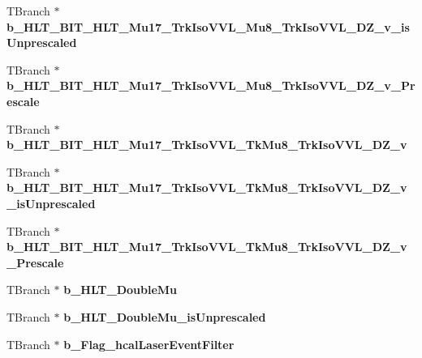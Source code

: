 \begin{DoxyCompactItemize}
\item 
\hypertarget{classMiniTree_a538e1530fa0f4f5f07d1247771ec656f}{}\label{classMiniTree_a538e1530fa0f4f5f07d1247771ec656f} 
T\+Branch $\ast$ {\bfseries b\+\_\+\+H\+L\+T\+\_\+\+B\+I\+T\+\_\+\+H\+L\+T\+\_\+\+Mu17\+\_\+\+Trk\+Iso\+V\+V\+L\+\_\+\+Mu8\+\_\+\+Trk\+Iso\+V\+V\+L\+\_\+\+D\+Z\+\_\+v\+\_\+is\+Unprescaled}
\item 
\hypertarget{classMiniTree_aa8f49c697d4c277028ecc2c251b75418}{}\label{classMiniTree_aa8f49c697d4c277028ecc2c251b75418} 
T\+Branch $\ast$ {\bfseries b\+\_\+\+H\+L\+T\+\_\+\+B\+I\+T\+\_\+\+H\+L\+T\+\_\+\+Mu17\+\_\+\+Trk\+Iso\+V\+V\+L\+\_\+\+Mu8\+\_\+\+Trk\+Iso\+V\+V\+L\+\_\+\+D\+Z\+\_\+v\+\_\+\+Prescale}
\item 
\hypertarget{classMiniTree_ae0fe7730a08495fa0900284d011ea243}{}\label{classMiniTree_ae0fe7730a08495fa0900284d011ea243} 
T\+Branch $\ast$ {\bfseries b\+\_\+\+H\+L\+T\+\_\+\+B\+I\+T\+\_\+\+H\+L\+T\+\_\+\+Mu17\+\_\+\+Trk\+Iso\+V\+V\+L\+\_\+\+Tk\+Mu8\+\_\+\+Trk\+Iso\+V\+V\+L\+\_\+\+D\+Z\+\_\+v}
\item 
\hypertarget{classMiniTree_a9ce73e85659876b81bc60ec43d76c1a6}{}\label{classMiniTree_a9ce73e85659876b81bc60ec43d76c1a6} 
T\+Branch $\ast$ {\bfseries b\+\_\+\+H\+L\+T\+\_\+\+B\+I\+T\+\_\+\+H\+L\+T\+\_\+\+Mu17\+\_\+\+Trk\+Iso\+V\+V\+L\+\_\+\+Tk\+Mu8\+\_\+\+Trk\+Iso\+V\+V\+L\+\_\+\+D\+Z\+\_\+v\+\_\+is\+Unprescaled}
\item 
\hypertarget{classMiniTree_a791e524b783a92404fde46774c0f00a7}{}\label{classMiniTree_a791e524b783a92404fde46774c0f00a7} 
T\+Branch $\ast$ {\bfseries b\+\_\+\+H\+L\+T\+\_\+\+B\+I\+T\+\_\+\+H\+L\+T\+\_\+\+Mu17\+\_\+\+Trk\+Iso\+V\+V\+L\+\_\+\+Tk\+Mu8\+\_\+\+Trk\+Iso\+V\+V\+L\+\_\+\+D\+Z\+\_\+v\+\_\+\+Prescale}
\item 
\hypertarget{classMiniTree_a8e4074e38340407fab39f99455e55298}{}\label{classMiniTree_a8e4074e38340407fab39f99455e55298} 
T\+Branch $\ast$ {\bfseries b\+\_\+\+H\+L\+T\+\_\+\+Double\+Mu}
\item 
\hypertarget{classMiniTree_a3de8581616aa8b314632b3487c7d0886}{}\label{classMiniTree_a3de8581616aa8b314632b3487c7d0886} 
T\+Branch $\ast$ {\bfseries b\+\_\+\+H\+L\+T\+\_\+\+Double\+Mu\+\_\+is\+Unprescaled}
\item 
\hypertarget{classMiniTree_a37f3abc436289e4f1eefd26ca9a59721}{}\label{classMiniTree_a37f3abc436289e4f1eefd26ca9a59721} 
T\+Branch $\ast$ {\bfseries b\+\_\+\+Flag\+\_\+hcal\+Laser\+Event\+Filter}
\item 
\hypertarget{classMiniTree_ac6aa2bcd6dda717bba4168d84a434aa7}{}\label{classMiniTree_ac6aa2bcd6dda717bba4168d84a434aa7} 

\end{DoxyCompactItemize}
